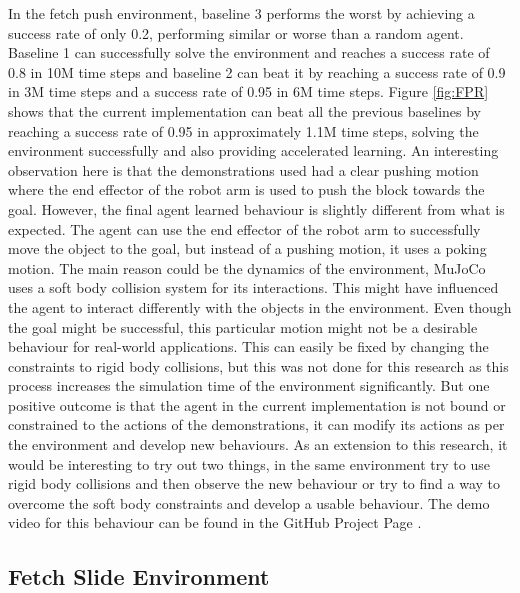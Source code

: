 In the fetch push environment, baseline 3 performs the worst by achieving a success rate of only 0.2, performing similar or worse than a random agent. Baseline 1 can successfully solve the environment and reaches a success rate of 0.8 in 10M time steps and baseline 2 can beat it by reaching a success rate of 0.9 in 3M time steps and a success rate of 0.95 in 6M time steps. Figure \ref{fig:FPR} shows that the current implementation can beat all the previous baselines by reaching a success rate of 0.95 in approximately 1.1M time steps, solving the environment successfully and also providing accelerated learning. An interesting observation here is that the demonstrations used had a clear pushing motion where the end effector of the robot arm is used to push the block towards the goal. However, the final agent learned behaviour is slightly different from what is expected. The agent can use the end effector of the robot arm to successfully move the object to the goal, but instead of a pushing motion, it uses a poking motion. The main reason could be the dynamics of the environment, MuJoCo uses a soft body collision system for its interactions. This might have influenced the agent to interact differently with the objects in the environment. Even though the goal might be successful, this particular motion might not be a desirable behaviour for real-world applications. This can easily be fixed by changing the constraints to rigid body collisions, but this was not done for this research as this process increases the simulation time of the environment significantly. But one positive outcome is that the agent in the current implementation is not bound or constrained to the actions of the demonstrations, it can modify its actions as per the environment and develop new behaviours. As an extension to this research, it would be interesting to try out two things, in the same environment try to use rigid body collisions and then observe the new behaviour or try to find a way to overcome the soft body constraints and develop a usable behaviour. The demo video for this behaviour can be found in the GitHub Project Page \cite{CurrentImplementation}. \\

\subsection{Fetch Slide Environment}

